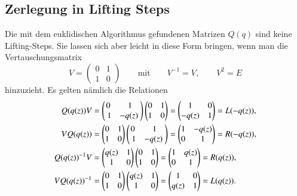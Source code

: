 \subsection{Zerlegung in Lifting Steps}
Die mit dem euklidischen Algorithmus gefundenen Matrizen $Q(q)$ sind
keine Lifting-Steps.
Sie lassen sich aber leicht in diese Form bringen, wenn man die
Vertauschungsmatrix 
\[
V
=
\begin{pmatrix}0&1\\1&0\end{pmatrix}
\qquad\text{mit}\qquad
V^{-1} = V, \qquad V^2=E
\]
hinzuzieht.
Es gelten nämlich die Relationen
\begin{align}
Q(q(z))V 
&=
\begin{pmatrix} 0 & 1 \\ 1 & -q(z) \end{pmatrix}
\begin{pmatrix}0&1\\1&0\end{pmatrix}
=
\begin{pmatrix} 1 & 0 \\ -q(z) & 1 \end{pmatrix}
=
L(-q(z)),
\notag
\\
VQ(q(z))
&=
\begin{pmatrix}0&1\\1&0\end{pmatrix}
\begin{pmatrix} 0 & 1 \\ 1 & -q(z) \end{pmatrix}
=
\begin{pmatrix} 1 & -q(z) \\ 0 & 1 \end{pmatrix}
=
R(-q(z)),
\notag
\\
Q(q(z))^{-1}V
&=
\begin{pmatrix} q(z) & 1 \\ 1 & 0 \end{pmatrix}
\begin{pmatrix}0&1\\1&0\end{pmatrix}
=
\begin{pmatrix} 1 & q(z) \\ 0 & 1 \end{pmatrix}
=
R(q(z)),
\label{lifting:step:qvr}
\\
VQ(q(z))^{-1}
&=
\begin{pmatrix}0&1\\1&0\end{pmatrix}
\begin{pmatrix} q(z) & 1 \\ 1 & 0 \end{pmatrix}
=
\begin{pmatrix} 1 & 0 \\ q(z) & 1 \end{pmatrix}
=
L(q(z)).
\label{lifting:step:vql}
\end{align}

